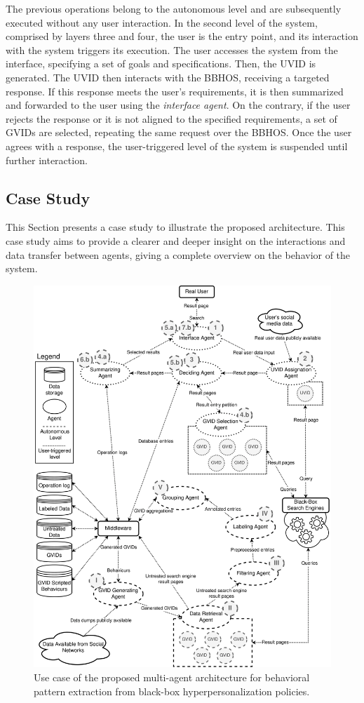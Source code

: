 The previous operations belong to the autonomous level and are subsequently executed without any user interaction. In the second level of the system, comprised by layers three and four, the user is the entry point, and its interaction with the system triggers its execution. The user accesses the system from the interface, specifying a set of goals and specifications. Then, the UVID is generated. The UVID then interacts with the BBHOS, receiving a targeted response. If this response meets the user's requirements, it is then summarized and forwarded to the user using the \textit{interface agent}. On the contrary, if the user rejects the response or it is not aligned to the specified requirements, a set of GVIDs are selected, repeating the same request over the BBHOS. Once the user agrees with a response, the user-triggered level of the system is suspended until further interaction.

\subsection{Case Study}\label{6_sec:subsec:case_study}


This Section presents a case study to illustrate the proposed architecture. This case study aims to provide a clearer and deeper insight on the interactions and data transfer between agents, giving a complete overview on the behavior of the system. 

\begin{figure}[t!]
    \centering
    \includegraphics[width=.9\linewidth]{6_kbsextractiondl/figures/Use_Case.eps}
    \caption{Use case of the proposed multi-agent architecture for behavioral pattern extraction from black-box hyperpersonalization policies.}
    \label{fig:mas_use_case}
\end{figure}

